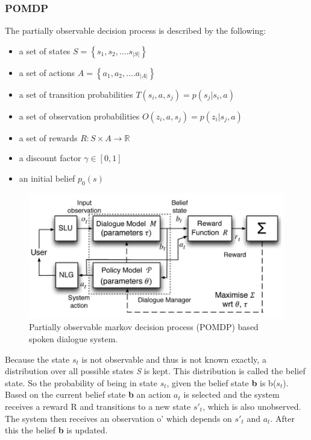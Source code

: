 \documentclass[conference]{IEEEtran}
\begin{document}
\subsubsection{POMDP}
The partially observable decision process is described by the following:
\begin{itemize}
\item{a set of states $S=\left \{ s_{1},s_{2},....s_{|S|}  \right \}$}
\item{a set of actions $A=\left \{ a_{1},a_{2},....a_{|A|}  \right \}$}
\item{a set of transition probabilities $T(s_{i},a,s_{j})=p(s_{j}|s_{i},a)$}
\item{a set of observation probabilities $O(z_{i},a,s_{j})=p(z_{i}|s_{j},a)$}
\item{a set of rewards $R:S\times A\rightarrow \mathbb{R}$}
\item{a discount factor $\gamma \in \left [ 0,1 \right ]$}
\item{an initial belief $p_{0}(s)$}
\end{itemize}

\begin{figure}[H]
\centering
   \includegraphics[width=\linewidth]{pomdp.jpg}
  \caption{Partially observable markov decision process (POMDP) based spoken dialogue system.\cite{young2013pomdp} }
  \label{fig:pomdp}
\end{figure}


Because the state $s_{t}$ is not observable and thus is not known exactly, a distribution over all possible states \emph{S} is kept. This distribution is called the belief state. So the probability of being in state $s_{t}$, given the belief state \textbf{b} is b($s_{t}$)\cite{young2007hidden}. 
Based on the current belief state \textbf{b} an action $a_{t}$ is selected and the system receives  a reward R and transitions to a new state $s'_{t}$, which is also unobserved. The system then receives an observation o' which depends on $s'_{t}$ and $a_{t}$. After this the belief \textbf{b} is updated\cite{young2007hidden,young2013pomdp}.
\end{document}
